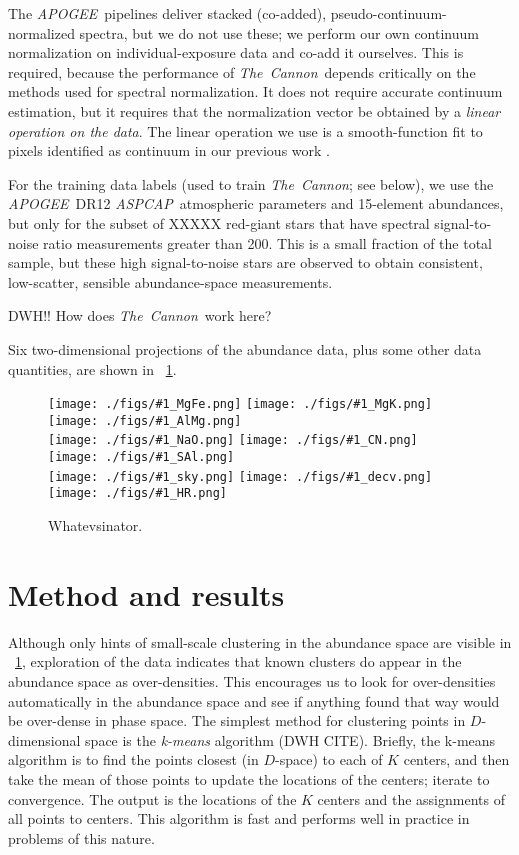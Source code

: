 \documentclass[12pt, letterpaper, preprint]{aastex}
\newcommand{\acronym}[1]{{\small{#1}}}
\newcommand{\project}[1]{\textsl{#1}}
\newcommand{\apogee}{\project{\acronym{APOGEE}}}
\newcommand{\aspcap}{\project{\acronym{ASPCAP}}}
\newcommand{\thecannon}{\project{The~Cannon}}
\newcommand{\insanefigure}[1]{%
\texttt{[image: ./figs/\#1\_MgFe.png]}%
\texttt{[image: ./figs/\#1\_MgK.png]}%
\texttt{[image: ./figs/\#1\_AlMg.png]}\\
\texttt{[image: ./figs/\#1\_NaO.png]}%
\texttt{[image: ./figs/\#1\_CN.png]}%
\texttt{[image: ./figs/\#1\_SAl.png]}\\
\texttt{[image: ./figs/\#1\_sky.png]}%
\texttt{[image: ./figs/\#1\_decv.png]}%
\texttt{[image: ./figs/\#1\_HR.png]}}
\begin{document}
The \apogee\ pipelines deliver stacked (co-added),
pseudo-continuum-normalized spectra, but we do not use these; we
perform our own continuum normalization on individual-exposure data
and co-add it ourselves.
This is required, because the performance of \thecannon\ depends
critically on the methods used for spectral normalization.  It does
not require accurate continuum estimation, but it requires that the
normalization vector be obtained by a \emph{linear operation on the
  data}.
The linear operation we use is a smooth-function fit to pixels
identified as continuum in our previous work \citep{thecannon}.

For the training data labels (used to train \thecannon; see below), we
use the \apogee\ \acronym{DR12} \aspcap\ atmospheric parameters and
15-element abundances, but only for the subset of XXXXX red-giant
stars that have spectral signal-to-noise ratio measurements greater
than 200.
This is a small fraction of the total sample, but these high
signal-to-noise stars are observed to obtain consistent, low-scatter,
sensible abundance-space measurements.

DWH!!  How does \thecannon\ work here?

Six two-dimensional projections of the abundance data, plus some other
data quantities, are shown in \figurename~\ref{fig:all}.

\begin{figure}[!p]
\insanefigure{all}
\caption{Whatevsinator.\label{fig:all}}
\end{figure}

\clearpage
\section{Method and results}

Although only hints of small-scale clustering in the abundance space
are visible in \figurename~\ref{fig:all}, exploration of the data indicates that
known clusters do appear in the abundance space as over-densities.
This encourages us to look for over-densities automatically in the
abundance space and see if anything found that way would be over-dense
in phase space.
The simplest method for clustering points in $D$-dimensional space is
the \emph{k-means} algorithm (DWH CITE).
Briefly, the k-means algorithm is to find the points closest (in
$D$-space) to each of $K$ centers, and then take the mean of those
points to update the locations of the centers; iterate to convergence.
The output is the locations of the $K$ centers and the assignments of
all points to centers.
This algorithm is fast and performs well in practice in problems of
this nature.
\end{document}
